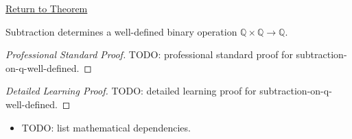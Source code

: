 \newpage
{}
\label{prf:subtraction-on-q-well-defined}

\begin{remark*}[Return]
\hyperref[thm:subtraction-on-q-well-defined]{Return to Theorem}
\end{remark*}

\begin{theorem*}
Subtraction determines a well-defined binary operation
$\mathbb{Q}\times\mathbb{Q}\to\mathbb{Q}$.
\end{theorem*}

\begin{proof}[Professional Standard Proof]
\LRAProofBodyStart
TODO: professional standard proof for subtraction-on-q-well-defined.
\end{proof}

\begin{proof}[Detailed Learning Proof]
\LRAProofBodyStart
TODO: detailed learning proof for subtraction-on-q-well-defined.
\end{proof}

\begin{remark*}
\end{remark*}

\begin{dependencies}
\begin{itemize}
  \item TODO: list mathematical dependencies.
\end{itemize}
\end{dependencies}

\clearpage
